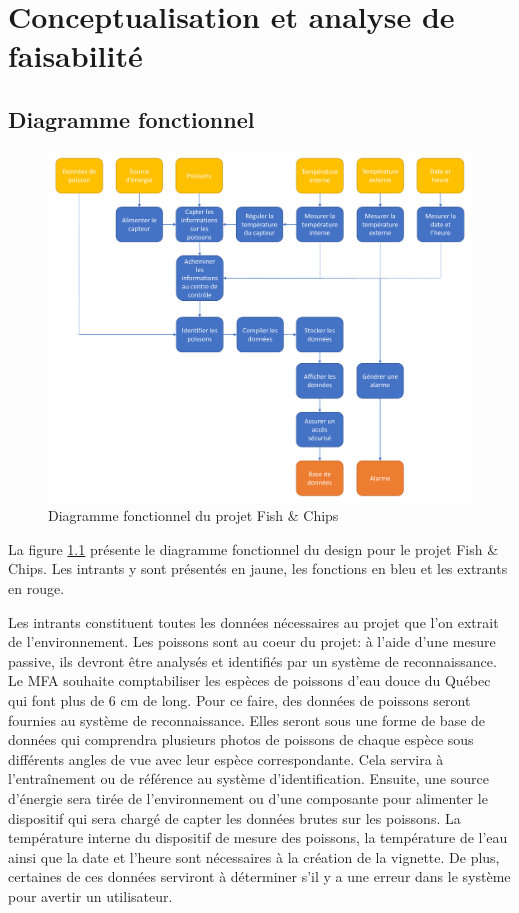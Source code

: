 
%
%

\chapter{Conceptualisation et analyse de faisabilité}
\label{s:conceptualisation_et_analyse}

\section{Diagramme fonctionnel}

\begin{figure}[!htb]
    \centering
    \includegraphics[width=0.85\linewidth]{fig/Diagramme_fonctionnel.pdf}
    \caption{Diagramme fonctionnel du projet Fish \& Chips}
    \label{fig:diagramme_fonctionnel}
\end{figure}

La figure \ref{fig:diagramme_fonctionnel} présente le diagramme fonctionnel du design pour le projet Fish \& Chips. Les intrants y sont présentés en jaune, les fonctions en bleu et les extrants en rouge.

Les intrants constituent toutes les données nécessaires au projet que l'on extrait de l'environnement. Les poissons sont au coeur du projet: à l'aide d'une mesure passive, ils devront être analysés et identifiés par un système de reconnaissance. Le MFA souhaite comptabiliser les espèces de poissons d'eau douce du Québec qui font plus de 6 cm de long. Pour ce faire, des données de poissons seront fournies au système de reconnaissance. Elles seront sous une forme de base de données qui comprendra plusieurs photos de poissons de chaque espèce sous différents angles de vue avec leur espèce correspondante. Cela servira à l'entraînement ou de référence au système d'identification. Ensuite, une source d'énergie sera tirée de l'environnement ou d'une composante pour alimenter le dispositif qui sera chargé de capter les données brutes sur les poissons. La température interne du dispositif de mesure des poissons, la température de l'eau ainsi que la date et l'heure sont nécessaires à la création de la vignette. De plus, certaines de ces données serviront à déterminer s'il y a une erreur dans le système pour avertir un utilisateur.

